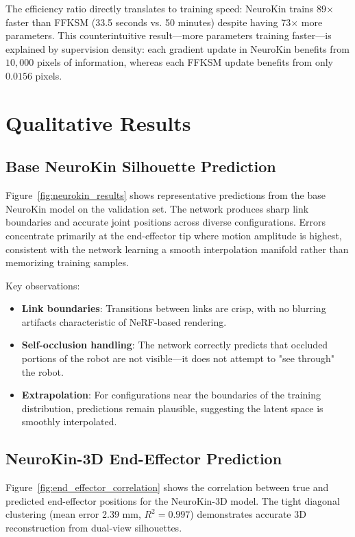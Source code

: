 \documentclass[12pt,a4paper,oneside]{report}
\begin{document}
The efficiency ratio directly translates to training speed: NeuroKin trains 89$\times$ faster than FFKSM (33.5 seconds vs. 50 minutes) despite having 73$\times$ more parameters. This counterintuitive result—more parameters training faster—is explained by supervision density: each gradient update in NeuroKin benefits from $10,000$ pixels of information, whereas each FFKSM update benefits from only $0.0156$ pixels.

\section{Qualitative Results}

\subsection{Base NeuroKin Silhouette Prediction}

Figure~\ref{fig:neurokin_results} shows representative predictions from the base NeuroKin model on the validation set. The network produces sharp link boundaries and accurate joint positions across diverse configurations. Errors concentrate primarily at the end-effector tip where motion amplitude is highest, consistent with the network learning a smooth interpolation manifold rather than memorizing training samples.

Key observations:

\begin{itemize}
    \item \textbf{Link boundaries}: Transitions between links are crisp, with no blurring artifacts characteristic of NeRF-based rendering.
    \item \textbf{Self-occlusion handling}: The network correctly predicts that occluded portions of the robot are not visible—it does not attempt to "see through" the robot.
    \item \textbf{Extrapolation}: For configurations near the boundaries of the training distribution, predictions remain plausible, suggesting the latent space is smoothly interpolated.
\end{itemize}

\subsection{NeuroKin-3D End-Effector Prediction}

Figure~\ref{fig:end_effector_correlation} shows the correlation between true and predicted end-effector positions for the NeuroKin-3D model. The tight diagonal clustering (mean error 2.39 mm, $R^2 = 0.997$) demonstrates accurate 3D reconstruction from dual-view silhouettes.
\end{document}

